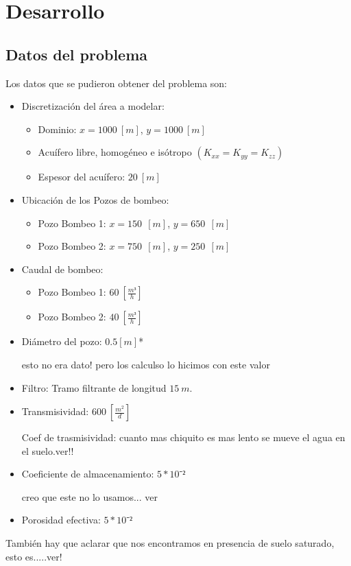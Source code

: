 \documentclass[10pt,a4paper,final]{article}
\begin{document}
\section{Desarrollo}
\subsection{Datos del problema}
\label{datos_problema}
Los datos que se pudieron obtener del problema son:
\begin{itemize}
	\item Discretización del área a modelar:	
	\begin{itemize}
		\item Dominio: $x=1000 ~\left[m\right]$, $y=1000 ~\left[m\right]$
		\item Acuífero libre, homogéneo e isótropo $(K_{xx} = K_{yy} = K_{zz})$
		\item Espesor del acuífero: $20 ~\left[m\right]$
	\end{itemize}
	\item Ubicación de los Pozos de bombeo:
	\begin{itemize}
		\item Pozo Bombeo 1: $x=150~~\left[m\right]$, $y=650 ~~\left[m\right]$
		\item Pozo Bombeo 2: $x=750~~\left[m\right]$, $y=250 ~~\left[m\right]$
	\end{itemize}
	\item Caudal de bombeo:
	\begin{itemize}
		\item Pozo Bombeo 1: $60~\left[\frac{m³}{h}\right]$
		\item Pozo Bombeo 2: $40~\left[\frac{m³}{h}\right]$
	\end{itemize}
	\item Diámetro del pozo: $0.5 [m]$* \begin{Large} esto no era dato! pero los calculso lo hicimos con este valor \end{Large}
	\item Filtro: Tramo filtrante de longitud $15~m.$
	\item Transmisividad: $600~\left[\frac{m^2}{d}\right]$\\
\begin{LARGE}
Coef de trasmisividad: cuanto mas chiquito es mas lento se mueve el agua en el suelo.ver!! \\
\end{LARGE}	
	\item Coeficiente de almacenamiento: $5*10⁻²$ \begin{LARGE}
	creo que este no lo usamos... ver
	\end{LARGE}
	\item Porosidad efectiva: $5*10⁻²$
\end{itemize}
\begin{Large}
También hay que aclarar que nos encontramos en presencia de suelo saturado, esto es.....ver!\\
\end{Large}
\end{document}
